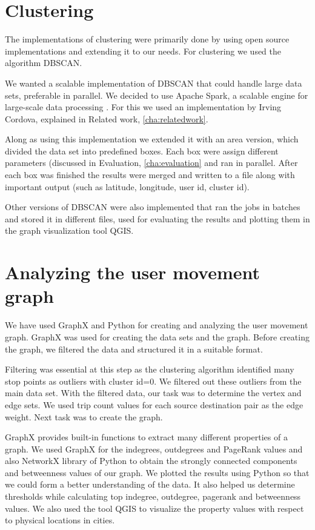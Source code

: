 \section{Clustering}

 The implementations of clustering were primarily done by using open source implementations and extending it to our needs. For clustering we used the algorithm DBSCAN. 
 
We wanted a scalable implementation of DBSCAN that could handle large data sets, preferable in parallel. We decided to use Apache Spark, a scalable engine for large-scale data processing \cite{spark}. For this we used an implementation by Irving Cordova, explained in Related work, \autoref{cha:relatedwork}. 

Along as using this implementation we extended it with an area version, which divided the data set into predefined boxes. Each box were assign different parameters (discussed in Evaluation, \autoref{cha:evaluation} and ran in parallel. After each box was finished the results were merged and written to a file along with important output (such as latitude, longitude, user id, cluster id).

Other versions of DBSCAN were also implemented that ran the jobs in batches and stored it in different files, used for evaluating the results and plotting them in the graph visualization tool QGIS.


\section{Analyzing the user movement graph}
We have used GraphX and Python for creating and analyzing the user movement graph. GraphX was used for creating the data sets and the graph. Before creating the graph, we filtered the data and structured it in a suitable format. 

Filtering was essential at this step as the clustering algorithm identified many stop points as outliers with cluster id=0. We filtered out these outliers from the main data set. With the filtered data, our task was to determine the vertex and edge sets. We used trip count values for each source destination pair as the edge weight. Next task was to create the graph.
 
GraphX provides built-in functions to extract many different properties of a graph. We used GraphX for the indegrees, outdegrees and PageRank values and also NetworkX library of Python to obtain the strongly connected components and betweenness values of our graph. We plotted the results using Python so that we could form a better understanding of the data. It also helped us determine thresholds while calculating top indegree, outdegree, pagerank and betweenness values. We also used the tool QGIS to visualize the property values with respect to physical locations in cities.

